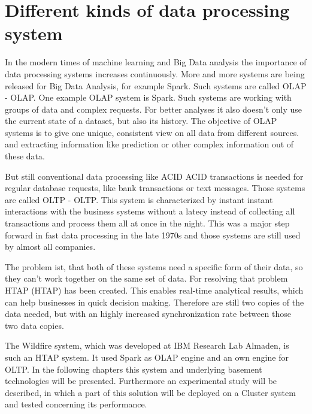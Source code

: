 \section{Different kinds of data processing system}

In the modern times of machine learning and Big Data analysis the importance of data processing systems increases continuously. More and more systems are being released for Big Data Analysis, for example Spark. Such systems are called \acs{OLAP} - \acl{OLAP}. One example OLAP system is Spark. Such systems are working with groups of data and complex requests. For better analyses it also doesn't only use the current state of a dataset, but also its history. The objective of OLAP systems is to give one unique, consistent view on all data from different sources. and extracting information like prediction or other complex information out of these data.


But still conventional data processing like \acs{ACID} \acl{ACID} transactions is needed for regular database requests, like bank transactions or text messages. Those systems are called \acl{OLTP} - \acl{OLTP}. This system is characterized by instant instant interactions with the business systems without a latecy instead of collecting all transactions and process them all at once in the night. This was a major step forward in fast data processing in the late 1970s and those systems are still used by almost all companies.


The problem ist, that both of these systems need a specific form of their data, so they can't work together on the same set of data. For resolving that problem \acs{HTAP} (\acl{HTAP}) has been created. This enables real-time analytical results, which can help businesses in quick decision making. Therefore are still two copies of the data needed, but with an highly increased synchronization rate between those two data copies.

The Wildfire system, which was developed at IBM Research Lab Almaden, is such an HTAP system. It used Spark as OLAP engine and an own engine for OLTP. In the following chapters this system and underlying basement technologies will be presented. Furthermore an experimental study will be described, in which a part of this solution will be deployed on a Cluster system and tested concerning its performance. 

